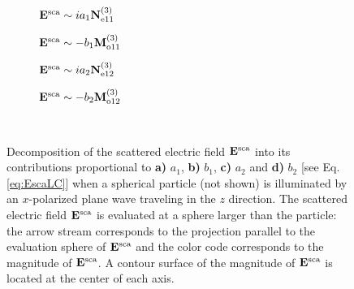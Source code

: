\begin{figure}[h!]
	\def\svgwidth{1\textwidth} \small
  \vspace*{3.0em}
  \hspace*{0.em}
    \begin{subfigure}{.24\textwidth}\caption{\centering $\vb{E}^\text{sca} \sim  i a_1 \vb{N}^{(3)}_{\text{e}11}$}\label{fig:VSH:a1}\end{subfigure}
  	\begin{subfigure}{.24\textwidth}\caption{\centering $\vb{E}^\text{sca} \sim  - b_1 \vb{M}^{(3)}_{\text{o}11}$}\label{fig:VSH:b1}\end{subfigure}
	\begin{subfigure}{.24\textwidth}\caption{\centering $\vb{E}^\text{sca} \sim  i a_2 \vb{N}^{(3)}_{\text{e}12}$}\label{fig:VSH:a2}\end{subfigure}
	\begin{subfigure}{.24\textwidth}\caption{\centering $\vb{E}^\text{sca} \sim  - b_2 \vb{M}^{(3)}_{\text{o}12}$}\label{fig:VSH:b2}\end{subfigure}
  \vspace*{-6.em}\\
  \vspace*{-2em}
  \caption[Multipolar Contributions to the Scattered Electric Field]{ Decomposition of the  scattered electric field $\vb{E}^\text{sca}$ into its contributions  proportional to \textbf{a)} $a_1$,  \textbf{b)}  $b_1$, \textbf{c)} $a_2$ and \textbf{d)} $b_2$ [see Eq. \eqref{eq:EscaLC}] when a spherical particle (not shown) is illuminated by an $x$-polarized plane wave traveling in the $z$ direction. The scattered electric field $\vb{E}^\text{sca}$ is evaluated at a sphere larger than the particle: the arrow stream corresponds to the projection parallel to the evaluation sphere of $\vb{E}^\text{sca}$  and the color code corresponds to the magnitude of  $\vb{E}^\text{sca}$. A contour surface of the magnitude of $\vb{E}^\text{sca}$ is located at the center of each axis. }
\label{fig:Multipoles}
\end{figure}

